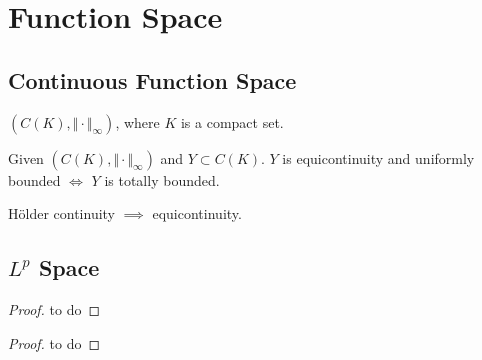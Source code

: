 \chapter{Function Space}

\section{Continuous Function Space}

\begin{notation}
$(C(K), \Vert \cdot \Vert_{\infty})$, where $K$ is a compact set. 
\end{notation}

\begin{definition}[equicontinuity]
\end{definition}

\begin{lemma}
Given $(C(K), \Vert \cdot \Vert_{\infty})$ and $Y \subset C(K)$. $Y$ is equicontinuity and uniformly bounded $\iff$ $Y$ is totally bounded. 
\end{lemma}

\begin{theorem}
\end{theorem}

\begin{definition}
\end{definition}

\begin{theorem}
Hölder continuity $\implies$ equicontinuity. 
\end{theorem}

\section{$L^{p}$ Space}

\begin{definition}[$L^{p}$ space]
\end{definition}

\begin{theorem}
\end{theorem}

\begin{proof}
to do
\end{proof}

\begin{theorem}[$L^{2}$ is separable]
\end{theorem}

\begin{proof}
to do
\end{proof}





